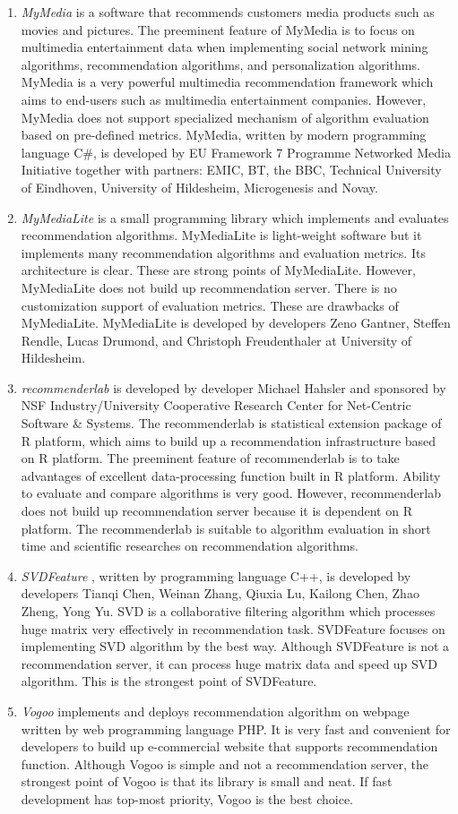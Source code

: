 \documentclass[a4paper,twoside]{article}
\begin{document}
\begin{enumerate}
\item \textit{MyMedia} \cite{mymedia} is a software that recommends customers media products such as movies and pictures. The preeminent feature of MyMedia is to focus on multimedia entertainment data when implementing social network mining algorithms, recommendation algorithms, and personalization algorithms. MyMedia is a very powerful multimedia recommendation framework which aims to end-users such as multimedia entertainment companies. However, MyMedia does not support specialized mechanism of algorithm evaluation based on pre-defined metrics. MyMedia, written by modern programming language C\#, is developed by EU Framework 7 Programme Networked Media Initiative together with partners: EMIC, BT, the BBC, Technical University of Eindhoven, University of Hildesheim, Microgenesis and Novay.
\item \textit{MyMediaLite} \cite{mymedialite} is a small programming library which implements and evaluates recommendation algorithms. MyMediaLite is light-weight software but it implements many recommendation algorithms and evaluation metrics. Its architecture is clear. These are strong points of MyMediaLite. However, MyMediaLite does not build up recommendation server. There is no customization support of evaluation metrics. These are drawbacks of MyMediaLite. MyMediaLite is developed by developers Zeno Gantner, Steffen Rendle, Lucas Drumond, and Christoph Freudenthaler at University of Hildesheim.
\item \textit{recommenderlab} \cite{recommenderlab} is developed by developer Michael Hahsler and sponsored by NSF Industry/University Cooperative Research Center for Net-Centric Software \& Systems. The recommenderlab is statistical extension package of R platform, which aims to build up a recommendation infrastructure based on R platform. The preeminent feature of recommenderlab is to take advantages of excellent data-processing function built in R platform. Ability to evaluate and compare algorithms is very good. However, recommenderlab does not build up recommendation server because it is dependent on R platform. The recommenderlab is suitable to algorithm evaluation in short time and scientific researches on recommendation algorithms.
\item \textit{SVDFeature} \cite{svdfeature}, written by programming language C++, is developed by developers Tianqi Chen, Weinan Zhang, Qiuxia Lu, Kailong Chen, Zhao Zheng, Yong Yu. SVD is a collaborative filtering algorithm which processes huge matrix very effectively in recommendation task. SVDFeature focuses on implementing SVD algorithm by the best way. Although SVDFeature is not a recommendation server, it can process huge matrix data and speed up SVD algorithm. This is the strongest point of SVDFeature.
\item \textit{Vogoo} \cite{vogoo} implements and deploys recommendation algorithm on webpage written by web programming language PHP. It is very fast and convenient for developers to build up e-commercial website that supports recommendation function. Although Vogoo is simple and not a recommendation server, the strongest point of Vogoo is that its library is small and neat. If fast development has top-most priority, Vogoo is the best choice.
\end{enumerate}
\end{document}
